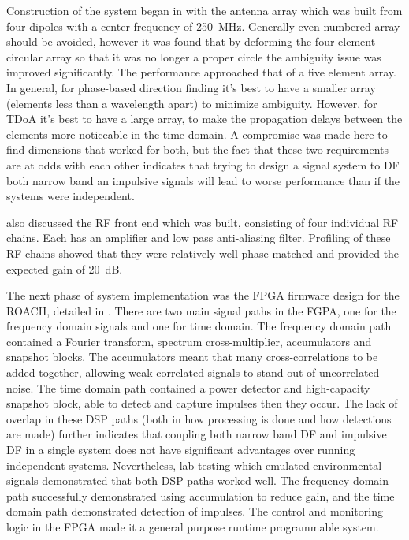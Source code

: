 Construction of the system began in  with the antenna array which was built from four dipoles with a center frequency of \SI{250}{\mega\hertz}. Generally even numbered array should be avoided, however it was found that by deforming the four element circular array so that it was no longer a proper circle the ambiguity issue was improved significantly. The performance approached that of a five element array. In general, for phase-based direction finding it's best to have a smaller array (elements less than a wavelength apart) to minimize ambiguity. However, for TDoA it's best to have a large array, to make the propagation delays between the elements more noticeable in the time domain. A compromise was made here to find dimensions that worked for both, but the fact that these two requirements are at odds with each other indicates that trying to design a signal system to DF both narrow band an impulsive signals will lead to worse performance than if the systems were independent. 

 also discussed the RF front end which was built, consisting of four individual RF chains. Each has an amplifier and low pass anti-aliasing filter. Profiling of these RF chains showed that they were relatively well phase matched and provided the expected gain of \SI{20}{\dB}.

The next phase of system implementation was the FPGA firmware design for the ROACH, detailed in . There are two main signal paths in the FGPA, one for the frequency domain signals and one for time domain. The frequency domain path contained a Fourier transform, spectrum cross-multiplier, accumulators and snapshot blocks. The accumulators meant that many cross-correlations to be added together, allowing weak correlated signals to stand out of uncorrelated noise. The time domain path contained a power detector and high-capacity snapshot block, able to detect and capture impulses then they occur. The lack of overlap in these DSP paths (both in how processing is done and how detections are made) further indicates that coupling both narrow band DF and impulsive DF in a single system does not have significant advantages over running independent systems. Nevertheless, lab testing which emulated environmental signals demonstrated that both DSP paths worked well. The frequency domain path successfully demonstrated using accumulation to reduce gain, and the time domain path demonstrated detection of impulses. The control and monitoring logic in the FPGA made it a general purpose runtime programmable system.

